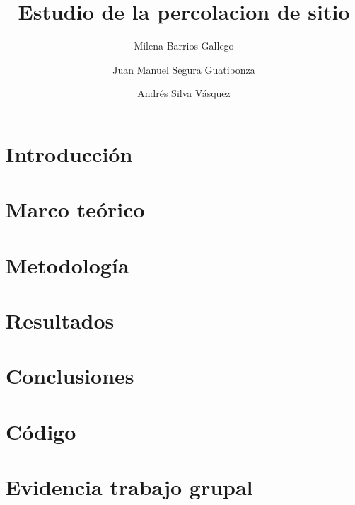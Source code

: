 \documentclass[12pt,a4paper,twoside]{tau-book}
\title{Estudio de la percolacion de sitio}
\author[1]{\large Milena Barrios Gallego}
\author[2]{\large Juan Manuel Segura Guatibonza}
\author[3]{\large Andrés Silva Vásquez}
\affil[1]{\normalsize Departamento de Física, Universidad Nacional de Colombia}
\begin{document}
	
    \maketitle
    \abscontent
    
    \thispagestyle{firststyle}


\section{Introducción}


\section{Marco teórico}



\section{Metodología}



\section{Resultados}



\section{Conclusiones}





\printbibliography

\appendix

\section{Código}


\noindent\href{}{}

\section{Evidencia trabajo grupal}


\end{document}
